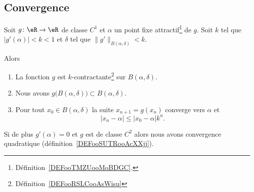 \subsection{Convergence}

\begin{proposition}      \label{PROPooRPHKooLnPCVJ}
	Soit \( g\colon \eR\to \eR\) de classe \( C^1\) et \( \alpha\) un point fixe attractif\footnote{Définition~\ref{DEFooTMZUooMoBDGC}.} de \( g\). Soit \( k\) tel que \( | g'(\alpha) |<k<1\) et \( \delta\) tel que \( \| g' \|_{B(\alpha,\delta)}<k\).

	Alors
	\begin{enumerate}
		\item       \label{ITEMooOQKMooTRSvUo}
		      La fonction \( g\) est \( k\)-contractante\footnote{Définition~\ref{DEFooRSLCooAsWisu}} sur \( B(\alpha,\delta)\).
		\item       \label{ITEMooFTAQooPBsBcR}
		      Nous avons \( g\big( B(\alpha,\delta) \big)\subset B(\alpha,\delta)\).
		\item       \label{ITEMooFSOAooKlcxih}
		      Pour tout \( x_0\in B(\alpha,\delta)\) la suite \( x_{n+1}=g(x_n)\) converge vers \( \alpha\) et
		      \begin{equation}
			      | x_n-\alpha |\leq | x_0-\alpha |k^n.
		      \end{equation}
	\end{enumerate}
	Si de plus \( g'(\alpha)=0\) et \( g\) est de classe \( C^2\) alors nous avons convergence quadratique (définition~\ref{DEFooSUTRooAcXXjj}).
\end{proposition}

